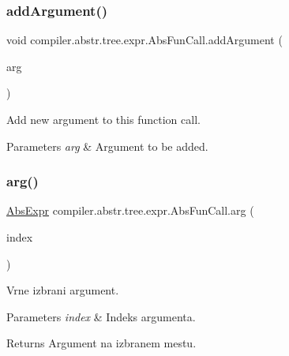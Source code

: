 \subsubsection{\texorpdfstring{add\+Argument()}{addArgument()}}
{\footnotesize\ttfamily void compiler.\+abstr.\+tree.\+expr.\+Abs\+Fun\+Call.\+add\+Argument (\begin{DoxyParamCaption}\item[{\hyperlink{classcompiler_1_1abstr_1_1tree_1_1expr_1_1_abs_labeled_expr}{Abs\+Labeled\+Expr}}]{arg }\end{DoxyParamCaption})}

Add new argument to this function call. 
\begin{DoxyParams}{Parameters}
{\em arg} & Argument to be added. \\
\hline
\end{DoxyParams}
\mbox{\label{classcompiler_1_1abstr_1_1tree_1_1expr_1_1_abs_fun_call_a10e0032d16fee0d22089c0726b2c3702}} 
\subsubsection{\texorpdfstring{arg()}{arg()}}
{\footnotesize\ttfamily \hyperlink{classcompiler_1_1abstr_1_1tree_1_1expr_1_1_abs_expr}{Abs\+Expr} compiler.\+abstr.\+tree.\+expr.\+Abs\+Fun\+Call.\+arg (\begin{DoxyParamCaption}\item[{int}]{index }\end{DoxyParamCaption})}

Vrne izbrani argument.


\begin{DoxyParams}{Parameters}
{\em index} & Indeks argumenta. \\
\hline
\end{DoxyParams}
\begin{DoxyReturn}{Returns}
Argument na izbranem mestu. 
\end{DoxyReturn}
\mbox{\label{classcompiler_1_1abstr_1_1tree_1_1expr_1_1_abs_fun_call_a98325b2c183df4b1f7f1a3697facc8ab}} 
